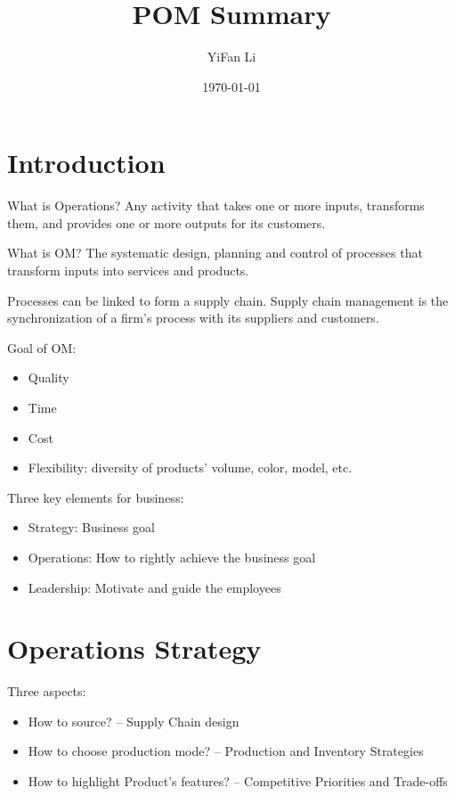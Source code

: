 \documentclass{article}
\title{POM Summary}
\author{YiFan Li}
\date{\today}
\newcommand{\red}[1]{\color{red}#1\color{black}\xspace}
\begin{document}
\maketitle
{}

\tableofcontents
\clearpage


\section{Introduction}

What is Operations?
Any activity that takes one or more \red{inputs}, \red{transforms} them, and provides one or more \red{outputs} for its customers.

What is OM?
The systematic \red{design}, \red{planning} and \red{control} of processes that transform inputs into services and products.

Processes can be linked to form a supply chain. Supply chain management is the synchronization of a firm's process with its suppliers and customers.

Goal of OM:
\begin{itemize}
	\item Quality
	\item Time
	\item Cost
	\item Flexibility: diversity of products' volume, color, model, etc.
\end{itemize}

Three key elements for business:
\begin{itemize}
	\item Strategy: Business goal
	\item Operations: How to rightly achieve the business goal
	\item Leadership: Motivate and guide the employees
\end{itemize}


\section{Operations Strategy}

Three aspects:

\begin{itemize}
	\item How to source? -- Supply Chain design
	\item How to choose production mode? -- Production and Inventory Strategies
	\item How to highlight Product's features? -- Competitive Priorities and Trade-offs
\end{itemize}
\end{document}
